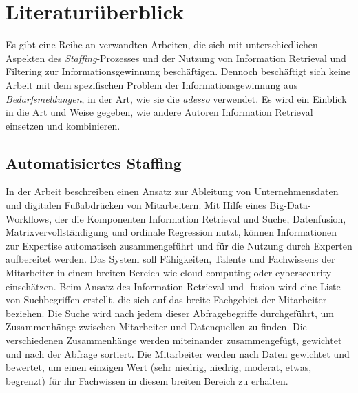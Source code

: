 \chapter{Literaturüberblick}
\label{sec:literaturueberblick}
Es gibt eine Reihe an verwandten Arbeiten, die sich mit unterschiedlichen Aspekten des \emph{Staffing}-Prozesses und der Nutzung von Information Retrieval und Filtering zur Informationsgewinnung beschäftigen. Dennoch beschäftigt sich keine Arbeit mit dem spezifischen Problem der Informationsgewinnung aus \emph{Bedarfsmeldungen}, in der Art, wie sie die \emph{adesso} verwendet. Es wird ein Einblick in die Art und Weise gegeben, wie andere Autoren Information Retrieval einsetzen und kombinieren.\\
\section{Automatisiertes Staffing}
In der Arbeit \cite{horesh2016information} beschreiben \citeauthor{horesh2016information} einen Ansatz zur Ableitung von Unternehmensdaten und digitalen Fußabdrücken von Mitarbeitern. Mit Hilfe eines Big-Data-Workflows, der die Komponenten Information Retrieval und Suche, Datenfusion, Matrixvervollständigung und ordinale Regression nutzt, können Informationen zur Expertise automatisch zusammengeführt und für die Nutzung durch Experten aufbereitet werden. Das System soll Fähigkeiten, Talente und Fachwissens der Mitarbeiter in einem breiten Bereich wie cloud computing oder cybersecurity einschätzen. Beim Ansatz des Information Retrieval und -fusion wird eine Liste von Suchbegriffen erstellt, die sich auf das breite Fachgebiet der Mitarbeiter beziehen. Die Suche wird nach jedem dieser Abfragebegriffe durchgeführt, um Zusammenhänge zwischen Mitarbeiter und Datenquellen zu finden. Die verschiedenen Zusammenhänge werden miteinander zusammengefügt, gewichtet und nach der Abfrage sortiert. Die Mitarbeiter werden nach Daten gewichtet und bewertet, um einen einzigen Wert (sehr niedrig, niedrig, moderat, etwas, begrenzt) für ihr Fachwissen in diesem breiten Bereich zu erhalten.\\
